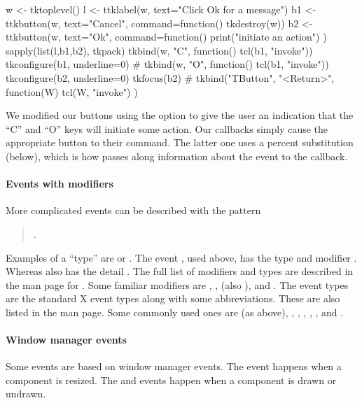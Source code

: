 \begin{Schunk}
\begin{Sinput}
 w <- tktoplevel()
 l <- ttklabel(w, text="Click Ok for a message")
 b1 <- ttkbutton(w, text="Cancel", command=function() tkdestroy(w))
 b2 <- ttkbutton(w, text="Ok", command=function() {
   print("initiate an action")
 })
 sapply(list(l,b1,b2), tkpack)
 tkbind(w, "C", function() tcl(b1, "invoke"))
 tkconfigure(b1, underline=0)
 #
 tkbind(w, "O", function() tcl(b1, "invoke"))
 tkconfigure(b2, underline=0)
 tkfocus(b2)
 #
 tkbind("TButton", "<Return>", function(W) {
   tcl(W, "invoke")
 })
\end{Sinput}
\end{Schunk}
%
We modified our buttons using the  option to give the
user an indication that the ``C'' and ``O'' keys will initiate some
action. Our callbacks simply cause the appropriate button to
 their command. The latter one uses a percent
substitution (below), which is how \TK\/ passes along information
about the event to the callback. 

\paragraph{Events with modifiers}
More complicated events can be described with the pattern

\begin{quotation}
.   
\end{quotation}

Examples of a ``type'' are  or
. The event , used
above, has the type  and modifier . Whereas
 also has the detail . The full
list of modifiers and types are described in the man page for
. Some familiar modifiers are , ,
 (also ),  and . The
event types are the standard X event types along with some
abbreviations. These are also listed in the  man page. Some
commonly used ones are  (as above), ,
, , ,
, and .

\paragraph{Window manager events}
Some events are based on window manager events. The 
event happens when a component is resized. The  and
 events happen when a component is drawn or undrawn.

